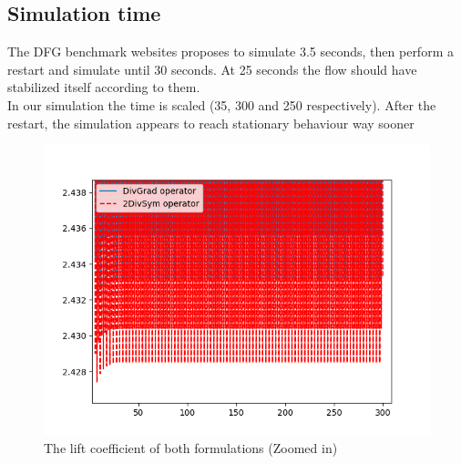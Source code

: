 \documentclass[]{scrartcl}
\begin{document}
\subsection{Simulation time}
The DFG benchmark websites proposes to simulate 3.5 seconds, then perform a restart and simulate until 30 seconds. At 25 seconds the flow should have stabilized itself according to them. \\
In our simulation the time is scaled (35, 300 and 250 respectively). After the restart, the simulation appears to reach stationary behaviour way sooner
\begin{figure}
	\centering
	\includegraphics[width=0.5\linewidth]{SimulationTime.png}
	\caption{The lift coefficient of both formulations (Zoomed in)}
	\label{Fig:SimulationTime}
\end{figure}
\end{document}
